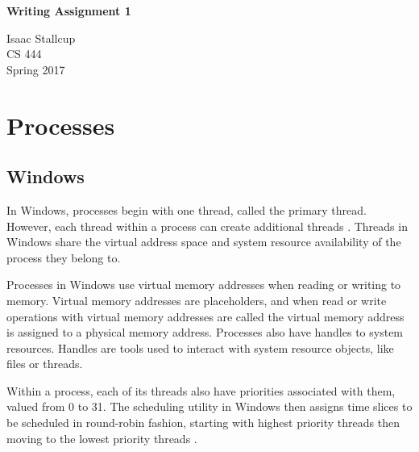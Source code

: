 \documentclass[10pt,draftclsnofoot,onecolumn,compsoc]{IEEEtran}
\author{Isaac Stallcup}
\begin{document}
	
	\begin{titlepage}
		
		\begin{center}

		\fontsize{20pt}{20pt}\selectfont
				
		\vspace*{3.5cm}
	
		\textbf{Writing Assignment 1}\\
		
		\vspace{0.5cm}
		
		\fontsize{16pt}{16pt}\selectfont
		
		Isaac Stallcup \\
		CS 444\\
		Spring 2017\\
		

		\end{center}
	
	\end{titlepage}
	
	\section{Processes}
	
	\subsection{Windows}
	
	In Windows, processes begin with one thread, called the primary thread. However, each thread within a process can create additional threads \cite{msdnproc}. Threads in Windows share the virtual address space and system resource availability of the process they belong to. 
	
	Processes in Windows use virtual memory addresses when reading or writing to memory. \cite{msdnproc} Virtual memory addresses are placeholders, and when read or write operations with virtual memory addresses are called the virtual memory address is assigned to a physical memory address. \cite{msdnvirt} Processes also have handles to system resources. Handles are tools used to interact with system resource objects, like files or threads. 
	
	Within a process, each of its threads also have priorities associated with them, valued from 0 to 31. \cite{msdnsched} The scheduling utility in Windows then assigns time slices to be scheduled in round-robin fashion, starting with highest priority threads then moving to the lowest priority threads \cite{msdnproc}.
	
\end{document}
